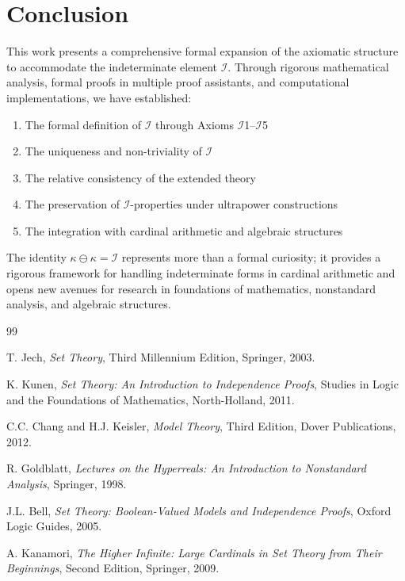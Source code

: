 \documentclass[12pt,a4paper]{article}
\theoremstyle{definition}
\theoremstyle{remark}
\begin{document}
\section{Conclusion}

This work presents a comprehensive formal expansion of the axiomatic structure to accommodate the indeterminate element $\mathcal{I}$. Through rigorous mathematical analysis, formal proofs in multiple proof assistants, and computational implementations, we have established:

\begin{enumerate}
\item The formal definition of $\mathcal{I}$ through Axioms $\mathcal{I}$1--$\mathcal{I}$5
\item The uniqueness and non-triviality of $\mathcal{I}$
\item The relative consistency of the extended theory
\item The preservation of $\mathcal{I}$-properties under ultrapower constructions
\item The integration with cardinal arithmetic and algebraic structures
\end{enumerate}

The identity $\kappa \ominus \kappa = \mathcal{I}$ represents more than a formal curiosity; it provides a rigorous framework for handling indeterminate forms in cardinal arithmetic and opens new avenues for research in foundations of mathematics, nonstandard analysis, and algebraic structures.


\begin{thebibliography}{99}

T. Jech, \emph{Set Theory}, Third Millennium Edition, Springer, 2003.

K. Kunen, \emph{Set Theory: An Introduction to Independence Proofs}, Studies in Logic and the Foundations of Mathematics, North-Holland, 2011.

C.C. Chang and H.J. Keisler, \emph{Model Theory}, Third Edition, Dover Publications, 2012.

R. Goldblatt, \emph{Lectures on the Hyperreals: An Introduction to Nonstandard Analysis}, Springer, 1998.

J.L. Bell, \emph{Set Theory: Boolean-Valued Models and Independence Proofs}, Oxford Logic Guides, 2005.

A. Kanamori, \emph{The Higher Infinite: Large Cardinals in Set Theory from Their Beginnings}, Second Edition, Springer, 2009.

\end{thebibliography}
\end{document}
